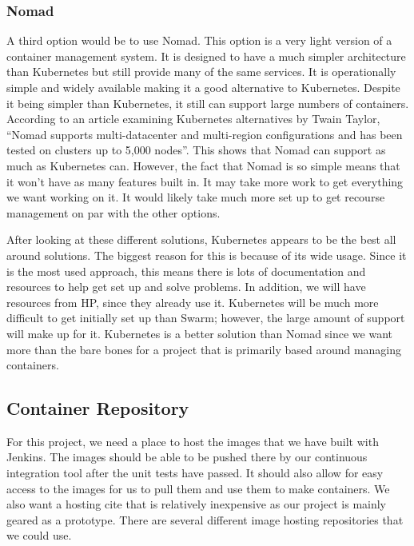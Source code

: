 \documentclass[onecolumn, draftclsnofoot,10pt, compsoc]{IEEEtran}
\begin{document}
\subsubsection{Nomad}
A third option would be to use Nomad. This option is a very light version of a container management system. It is designed to have a much simpler architecture than Kubernetes but still provide many of the same services. It is operationally simple and widely available making it a good alternative to Kubernetes. Despite it being simpler than Kubernetes, it still can support large numbers of containers. According to an article examining Kubernetes alternatives by Twain Taylor, “Nomad supports multi-datacenter and multi-region configurations and has been tested on clusters up to 5,000 nodes”.\cite{kub_daniel_tech} This shows that Nomad can support as much as Kubernetes can. However, the fact that Nomad is so simple means that it won't have as many features built in. It may take more work to get everything we want working on it. It would likely take much more set up to get recourse management on par with the other options.

\par
After looking at these different solutions, Kubernetes appears to be the best all around solutions. The biggest reason for this is because of its wide usage. Since it is the most used approach, this means there is lots of documentation and resources to help get set up and solve problems. In addition, we will have resources from HP, since they already use it. Kubernetes will be much more difficult to get initially set up than Swarm; however, the large amount of support will make up for it. Kubernetes is a better solution than Nomad since we want more than the bare bones for a project that is primarily based around managing containers. 



\subsection{Container Repository}
For this project, we need a place to host the images that we have built with Jenkins. The images should be able to be pushed there by our continuous integration tool after the unit tests have passed. It should also allow for easy access to the images for us to pull them and use them to make containers. We also want a hosting cite that is relatively inexpensive as our project is mainly geared as a prototype. There are several different image hosting repositories that we could use. 
\end{document}
